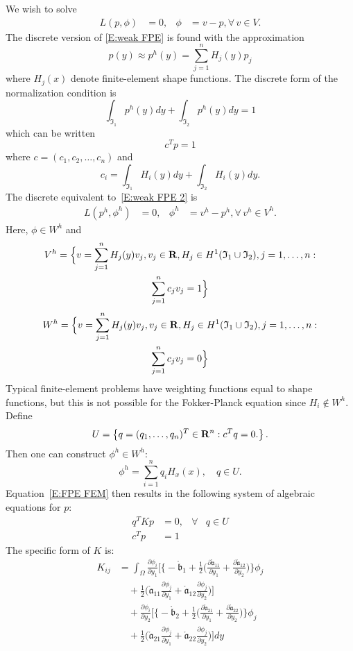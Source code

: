 We wish to solve
\begin{align}
\label{E:weak FPE 2}
L(p,\phi) &= 0, & \phi &= v - p, \forall \, v \in V.
\end{align}
The discrete version of \eqref{E:weak FPE} is found with the approximation
\[
p(y) \approx p^h(y) = \sum_{j=1}^n H_j(y) p_j
\]
where $H_j(x)$ denote finite-element shape functions. The discrete form of the normalization condition is
\[
\int_{\mathfrak I_1} p^h(y) dy + \int_{\mathfrak I_2} p^h(y) dy = 1
\]
which can be written
\[
c^T p = 1
\]
where $c = (c_1, c_2, \dots, c_n)$ and
\[
c_i = \int_{\mathfrak I_1} H_i(y) dy + \int_{\mathfrak I_2} H_i(y) dy.
\]
The discrete equivalent to~\eqref{E:weak FPE 2} is
\begin{align}
L(p^h,\phi^h) &= 0, & \phi^h &= v^h - p^h, \forall \, v^h \in V^h.
\label{E:FPE FEM}
\end{align}
Here, $\phi \in W^h$ and
\begin{multline*}
V^h = \Big\{v = \sum_{j=1}^n H_j(y) v_j, v_j \in \mathbf R, H_j \in H^1(\mathfrak I_1 \cup \mathfrak I_2), j = 1,\dots,n:\\
\sum_{j=1}^n c_j v_j = 1\Big\}
\end{multline*}
\begin{multline*}
W^h = \Big\{v = \sum_{j=1}^n H_j(y) v_j, v_j \in \mathbf R, H_j \in H^1(\mathfrak I_1 \cup \mathfrak I_2), j = 1,\dots,n:\\
\sum_{j=1}^n c_j v_j = 0\Big\}
\end{multline*}
Typical finite-element problems have weighting functions equal to shape functions, but this is not possible for the Fokker-Planck equation since $H_i \notin W^h$. Define
\[
U = \left\{q = (q_1,\dots,q_n)^T \in \mathbf R^n: c^T q = 0.\right\}.
\]
Then one can construct $\phi^h \in W^h$:
\[
\phi^h = \sum_{i=1}^n q_i H_x(x), \quad q \in U.
\]
Equation~\eqref{E:FPE FEM} then results in the following system of algebraic equations for $p$:
\begin{align*}
q^T K p &= 0, & \forall& q \in U\\
c^T p &= 1
\end{align*}
The specific form of $K$ is:
\begin{align*}
K_{ij} &= \int_\Omega \frac{\partial \phi_i}{\partial y_1} \Big[\Big\{-\mathring{\mathfrak b}_1 + \frac12 \Big(\frac{\partial \mathring{\mathfrak a}_{11}}{\partial y_1} + \frac{\partial \mathring{\mathfrak a}_{12}}{\partial y_2}\Big)\Big\}\phi_j\\
&\quad + \frac12 \Big(\mathring{\mathfrak a}_{11}\frac{\partial \phi_j}{\partial y_1} +
\mathring{\mathfrak a}_{12} \frac{\partial \phi_j}{\partial y_2} \Big) \Big] \\
&\quad + \frac{\partial \phi_i}{\partial y_2} \Big[\Big\{-\mathring{\mathfrak b}_2 + \frac12 \Big(\frac{\partial \mathring{\mathfrak a}_{21}}{\partial y_1} + \frac{\partial
\mathring{\mathfrak a}_{22}}{\partial y_2}\Big)\Big\}\phi_j\\
&\quad + \frac12 \Big(\mathring{\mathfrak a}_{21} \frac{\partial \phi_j}{\partial y_1} +
\mathring{\mathfrak a}_{22} \frac{\partial \phi_j}{\partial y_2} \Big) \Big] dy
\end{align*}


